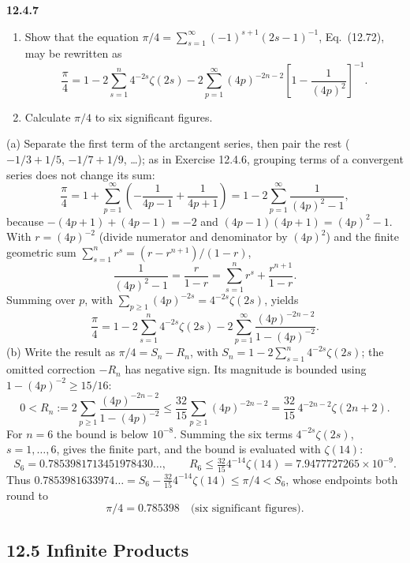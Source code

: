 \par\bigskip
\noindent\textbf{12.4.7}\quad
\begin{enumerate}
\item[(a)] Show that the equation
  $\pi/4=\sum_{s=1}^{\infty}(-1)^{s+1}(2s-1)^{-1}$, Eq.~(12.72), may be
  rewritten as
  \[
  \frac{\pi}{4}=1-2\sum_{s=1}^{n}4^{-2s}\zeta(2s)
  -2\sum_{p=1}^{\infty}(4p)^{-2n-2}\left[1-\frac{1}{(4p)^{2}}\right]^{-1}.
  \]
\item[(b)] Calculate $\pi/4$ to six significant figures.
\end{enumerate}
\solution
(a) Separate the first term of the arctangent series, then pair the rest
($-1/3+1/5$, $-1/7+1/9$, \ldots); as in Exercise 12.4.6, grouping terms
of a convergent series does not change its sum:
\[
\frac\pi4=1+\sum_{p=1}^\infty
\left(-\frac1{4p-1}+\frac1{4p+1}\right)
=1-2\sum_{p=1}^\infty\frac1{(4p)^2-1},
\]
because $-(4p+1)+(4p-1)=-2$ and $(4p-1)(4p+1)=(4p)^2-1$.
With $r=(4p)^{-2}$ (divide numerator and denominator by $(4p)^2$) and
the finite geometric sum $\sum_{s=1}^nr^s=(r-r^{n+1})/(1-r)$,
\[
\frac1{(4p)^2-1}=\frac r{1-r}
=\sum_{s=1}^nr^s+\frac{r^{n+1}}{1-r}.
\]
Summing over $p$, with $\sum_{p\ge1}(4p)^{-2s}=4^{-2s}\zeta(2s)$, yields
\[
\boxed{\frac\pi4=1-2\sum_{s=1}^n4^{-2s}\zeta(2s)
-2\sum_{p=1}^\infty
\frac{(4p)^{-2n-2}}{1-(4p)^{-2}}}.
\]
(b) Write the result as $\pi/4=S_n-R_n$, with
$S_n=1-2\sum_{s=1}^n4^{-2s}\zeta(2s)$; the omitted correction $-R_n$ has
negative sign. Its magnitude is bounded
using $1-(4p)^{-2}\ge15/16$:
\[
0<R_n:=2\sum_{p\ge1}\frac{(4p)^{-2n-2}}{1-(4p)^{-2}}
\le\frac{32}{15}\sum_{p\ge1}(4p)^{-2n-2}
=\frac{32}{15}\,4^{-2n-2}\zeta(2n+2).
\]
For $n=6$ the bound is below $10^{-8}$. Summing the six terms
$4^{-2s}\zeta(2s)$, $s=1,\ldots,6$, gives the finite part, and the bound is
evaluated with $\zeta(14)$:
\[
S_6=0.7853981713451978430\ldots,\qquad
R_6\le\tfrac{32}{15}4^{-14}\zeta(14)=7.9477727265\times10^{-9}.
\]
Thus $0.7853981633974\ldots=S_6-\tfrac{32}{15}4^{-14}\zeta(14)\le\pi/4<S_6$,
whose endpoints both round to
\[
\boxed{\pi/4=0.785398\quad\text{(six significant figures)}}.
\]

\subsection*{12.5 Infinite Products}

